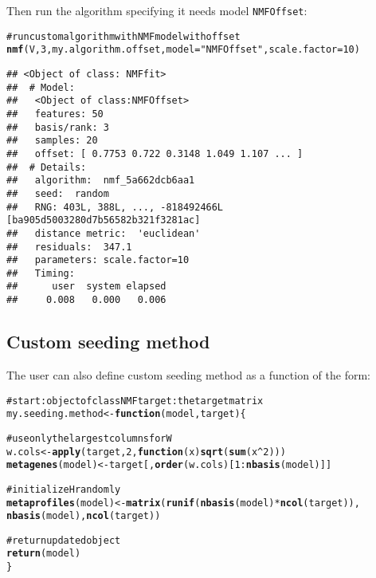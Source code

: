 \documentclass[a4paper]{article}\usepackage{graphicx, color}
\makeatletter
\newcommand{\hlfunctioncall}[1]{\textcolor[rgb]{0.501960784313725,0,0.329411764705882}{\textbf{#1}}}%
\newcommand{\hlstring}[1]{\textcolor[rgb]{0.6,0.6,1}{#1}}%
\newcommand{\hlcomment}[1]{\textcolor[rgb]{0.180392156862745,0.6,0.341176470588235}{#1}}%
\newenvironment{kframe}{%
 \def\at@end@of@kframe{}%
 \ifinner\ifhmode%
  \def\at@end@of@kframe{\end{minipage}}%
  \begin{minipage}{\columnwidth}%
 \fi\fi%
 \def\FrameCommand##1{\hskip\@totalleftmargin \hskip-\fboxsep
 \colorbox{shadecolor}{##1}\hskip-\fboxsep
     \hskip-\linewidth \hskip-\@totalleftmargin \hskip\columnwidth}%
 \MakeFramed {\advance\hsize-\width
   \@totalleftmargin\z@ \linewidth\hsize
   \@setminipage}}%
 {\par\unskip\endMakeFramed%
 \at@end@of@kframe}
\newenvironment{knitrout}{}{} %
\let\code=\texttt
\makeatother
\begin{document}
Then run the algorithm specifying it needs model \code{NMFOffset}:
\begin{knitrout}
\color{fgcolor}\begin{kframe}
\begin{alltt}
\hlcomment{# run custom algorithm with NMF model with offset}
\hlfunctioncall{nmf}(V, 3, my.algorithm.offset, model = \hlstring{"NMFOffset"}, scale.factor = 10)
\end{alltt}
\begin{verbatim}
## <Object of class: NMFfit>
##  # Model:
##   <Object of class:NMFOffset>
##   features: 50 
##   basis/rank: 3 
##   samples: 20 
##   offset: [ 0.7753 0.722 0.3148 1.049 1.107 ... ]
##  # Details:
##   algorithm:  nmf_5a662dcb6aa1 
##   seed:  random 
##   RNG: 403L, 388L, ..., -818492466L [ba905d5003280d7b56582b321f3281ac]
##   distance metric:  'euclidean' 
##   residuals:  347.1 
##   parameters: scale.factor=10 
##   Timing:
##      user  system elapsed 
##     0.008   0.000   0.006
\end{verbatim}
\end{kframe}
\end{knitrout}



\subsection{Custom seeding method}\label{sec:seed_custom}

The user can also define custom seeding method as a function of the form:


\begin{knitrout}
\color{fgcolor}\begin{kframe}
\begin{alltt}

\hlcomment{# start: object of class NMF target: the target matrix}
my.seeding.method <- \hlfunctioncall{function}(model, target) \{
    
    \hlcomment{# use only the largest columns for W}
    w.cols <- \hlfunctioncall{apply}(target, 2, \hlfunctioncall{function}(x) \hlfunctioncall{sqrt}(\hlfunctioncall{sum}(x^2)))
    \hlfunctioncall{metagenes}(model) <- target[, \hlfunctioncall{order}(w.cols)[1:\hlfunctioncall{nbasis}(model)]]
    
    \hlcomment{# initialize H randomly}
    \hlfunctioncall{metaprofiles}(model) <- \hlfunctioncall{matrix}(\hlfunctioncall{runif}(\hlfunctioncall{nbasis}(model) * \hlfunctioncall{ncol}(target)), 
        \hlfunctioncall{nbasis}(model), \hlfunctioncall{ncol}(target))
    
    \hlcomment{# return updated object}
    \hlfunctioncall{return}(model)
\}
\end{alltt}
\end{kframe}
\end{knitrout}
\end{document}
